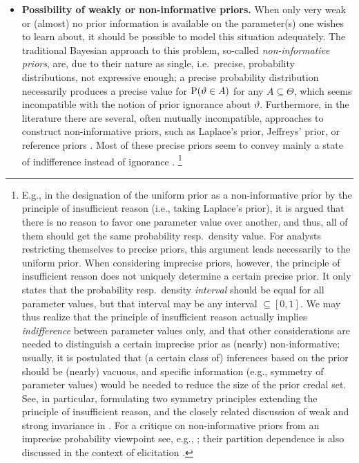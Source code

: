 \begin{itemize}
\item \textbf{Possibility of weakly or non-informative priors.}
When only very weak or (almost) no prior information is available on the parameter(s) one wishes to learn about,
it should be possible to model this situation adequately.
The traditional Bayesian approach to this problem, so-called \emph{non-informative priors},
are, due to their nature as single, i.e.\ precise, probability distributions, not expressive enough;
a precise probability distribution necessarily produces a precise value for $\operatorname{P}(\vartheta \in A)$ for any $A \subseteq \Theta$,
which seems incompatible with the notion of prior ignorance about $\vartheta$.
Furthermore, in the literature there are several, often mutually incompatible, approaches to construct non-informative priors,
such as Laplace's prior, Jeffreys' prior, or reference priors \parencite[see, e.g.,][\S 5.6.2]{2000:bernardosmith}.
Most of these precise priors seem to convey mainly a state of indifference instead of ignorance \parencite[p.~271]{1999:rueger}.%
\footnote{\label{footnote:symm}
E.g., in the designation of the uniform prior as a non-informative prior by the principle of insufficient reason
(i.e., taking Laplace's prior),
it is argued that there is no reason to favor one parameter value over another,
and thus, all of them should get the same probability resp.\ density value.
For analysts restricting themselves to precise priors, this argument leads necessarily to the uniform prior.
When considering imprecise priors, however, the principle of insufficient reason does not uniquely determine a certain precise prior.
It only states that the probability resp.\ density \emph{interval} should be equal for all parameter values,
but that interval may be any interval $\subseteq [0,1]$.
We may thus realize that the principle of insufficient reason actually implies \emph{indifference} between parameter values only,
and that other considerations are needed to distinguish a certain imprecise prior as (nearly) non-informative;
usually, it is postulated that (a certain class of) inferences based on the prior should be (nearly) vacuous,
and specific information (e.g., symmetry of parameter values) would be needed to reduce the size of the prior credal set.
See, in particular, \textcite[\S 4.3]{2001:weichselberger} formulating two symmetry principles
extending the principle of insufficient reason,
and the closely related discussion of weak and strong invariance in \textcite[\S 3]{itip-structural}.
For a critique on non-informative priors from an imprecise probability viewpoint see, e.g., \textcite[\S 5.5]{1991:walley};
their partition dependence is also discussed in the context of elicitation \parencite[see][\S 3]{itip-elicitation}.}
\end{itemize}

